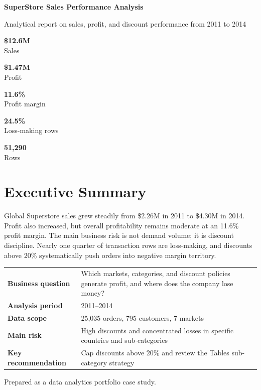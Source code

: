 \documentclass[11pt,a4paper]{article}
\newcommand{\metric}[2]{
    \begin{minipage}[t]{0.18\textwidth}
        \colorbox{panel}{
            \begin{minipage}[t][25mm][c]{0.92\linewidth}
                \centering
                {\Large\bfseries\color{ink} #1}\\[2mm]
                {\small\color{muted} #2}
            \end{minipage}
        }
    \end{minipage}
}
\begin{document}
\begin{titlepage}
    \thispagestyle{fancy}
    \vspace*{8mm}
    {\Huge\bfseries\color{ink} SuperStore Sales Performance Analysis\par}
    \vspace{3mm}
    {\Large\color{muted} Analytical report on sales, profit, and discount performance from 2011 to 2014\par}
    \vspace{12mm}

    \metric{\$12.6M}{Sales}
    \hfill
    \metric{\$1.47M}{Profit}
    \hfill
    \metric{11.6\%}{Profit margin}
    \hfill
    \metric{24.5\%}{Loss-making rows}
    \hfill
    \metric{51,290}{Rows}

    \vspace{14mm}
    \section*{Executive Summary}
    Global Superstore sales grew steadily from \$2.26M in 2011 to \$4.30M in 2014.
    Profit also increased, but overall profitability remains moderate at an 11.6\% profit margin.
    The main business risk is not demand volume; it is discount discipline. Nearly one quarter of transaction rows are loss-making, and discounts above 20\% systematically push orders into negative margin territory.

    \vspace{4mm}
    \begin{tabularx}{\textwidth}{>{\bfseries}p{42mm}X}
        \toprule
        Business question & Which markets, categories, and discount policies generate profit, and where does the company lose money? \\
        Analysis period & 2011--2014 \\
        Data scope & 25,035 orders, 795 customers, 7 markets \\
        Main risk & High discounts and concentrated losses in specific countries and sub-categories \\
        Key recommendation & Cap discounts above 20\% and review the Tables sub-category strategy \\
        \bottomrule
    \end{tabularx}

    \vfill
    {\color{muted} Prepared as a data analytics portfolio case study.}
\end{titlepage}
\setcounter{page}{2}
\end{document}
